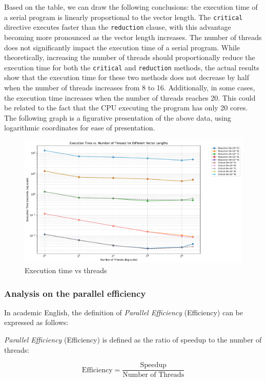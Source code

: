 \documentclass[unicode,11pt,a4paper,oneside,numbers=endperiod,openany]{scrartcl}
\begin{document}
Based on the table, we can draw the following conclusions: the execution time of a serial program is linearly proportional to the vector length. The \texttt{critical} directive executes faster than the \texttt{reduction} clause, with this advantage becoming more pronounced as the vector length increases. The number of threads does not significantly impact the execution time of a serial program. While theoretically, increasing the number of threads should proportionally reduce the execution time for both the \texttt{critical} and \texttt{reduction} methods, the actual results show that the execution time for these two methods does not decrease by half when the number of threads increases from 8 to 16. Additionally, in some cases, the execution time increases when the number of threads reaches 20. This could be related to the fact that the CPU executing the program has only 20 cores.
The following graph is a figurative presentation of the above data, using logarithmic coordinates for ease of presentation.
\newpage
\begin{figure}[h]
    \centering
    \includegraphics[width=1\textwidth]{pictures/execution_time_vs_threads.pdf}
    \caption{Execution time vs threads}
\end{figure}
\subsubsection{Analysis on the parallel efficiency}
In academic English, the definition of \textit{Parallel Efficiency} (Efficiency) can be expressed as follows:

\textit{Parallel Efficiency} (Efficiency) is defined as the ratio of speedup to the number of threads:

\[
\text{Efficiency} = \frac{\text{Speedup}}{\text{Number of Threads}}
\]
\end{document}

